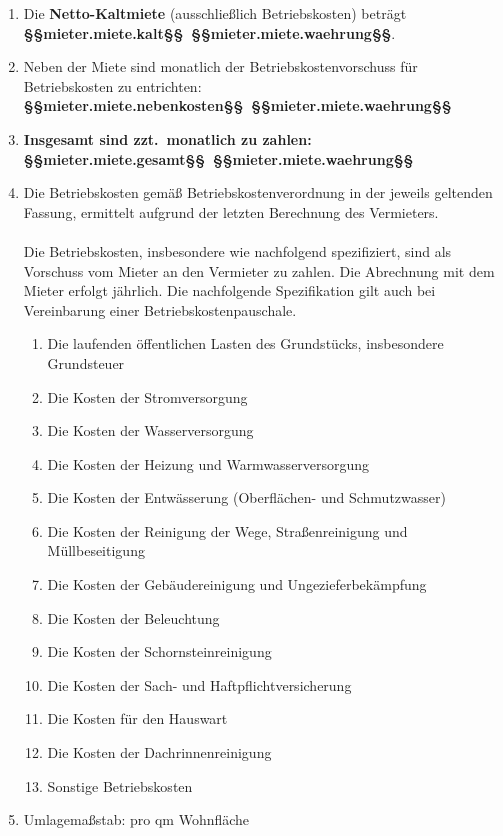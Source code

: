 \documentclass{scrreprt}[12pt,a4paper,twoside,duplex]
\begin{document}
\begin{contract}

\begin{enumerate}
  \item Die \textbf{Netto-Kaltmiete} (ausschließlich Betriebskosten) beträgt \textbf{§§mieter.miete.kalt§§\ §§mieter.miete.waehrung§§}.
  \item Neben der Miete sind monatlich der Betriebskostenvorschuss für Betriebskosten zu entrichten: \textbf{§§mieter.miete.nebenkosten§§\ §§mieter.miete.waehrung§§}
  \item \textbf{Insgesamt sind zzt.\ monatlich zu zahlen: §§mieter.miete.gesamt§§\ §§mieter.miete.waehrung§§}
  \item\label{betriebskosten} Die Betriebskosten gemäß Betriebskostenverordnung
  in der jeweils geltenden Fassung, ermittelt aufgrund der letzten Berechnung
  des Vermieters.\\
  \\
  Die Betriebskosten, insbesondere wie nachfolgend spezifiziert, sind als
  Vorschuss vom Mieter an den Vermieter zu zahlen. Die Abrechnung mit dem Mieter
  erfolgt jährlich. Die nachfolgende Spezifikation gilt auch bei Vereinbarung
  einer Betriebskostenpauschale.
  \begin{multicols}{2}
    \begin{enumerate}[label*=\arabic*\,)]
      \item Die laufenden öffentlichen Lasten des Grundstücks, insbesondere
      Grundsteuer
      \item Die Kosten der Stromversorgung
      \item Die Kosten der Wasserversorgung
      \item Die Kosten der Heizung und Warmwasserversorgung
      \item Die Kosten der Entwässerung (Ober\-flächen- und Sch\-mutz\-wasser)
      \item Die Kosten der Reinigung der Wege, Straßenreinigung und Müllbeseitigung
      \item Die Kosten der Ge\-bäu\-de\-rei\-ni\-gung und Ungezieferbekämpfung
      \item Die Kosten der Beleuchtung
      \item Die Kosten der Schornsteinreinigung
      \item Die Kosten der Sach- und Haft\-pflicht\-ver\-si\-che\-rung
      \item Die Kosten für den Hauswart
      \item Die Kosten der Dachrinnenreinigung
      \item Sonstige Betriebskosten
    \end{enumerate}
  \end{multicols}
  \item Umlagemaßstab: pro qm Wohnfläche


\end{enumerate}
\end{contract}
\end{document}
